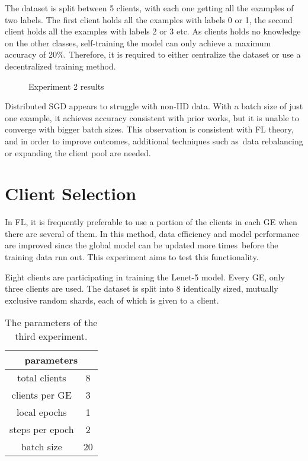The dataset is split between 5 clients, with each one getting all the examples of two labels. The first client holds all the examples with labels 0 or 1, the second client holds all the examples with labels 2 or 3 etc. As clients holds no knowledge on the other classes, self-training the model can only achieve a maximum accuracy of 20\%. Therefore, it is required to either centralize the dataset or use a decentralized training method.

\begin{figure}[H]
    \center
    
    \caption[Experiment 2 results]{Experiment 2 results}
    \label{fig:Experiment 2 results}
\end{figure}

Distributed SGD appears to struggle with non-IID data. With a batch size of just one example, it achieves accuracy consistent with prior works\cite{FL-original-paper}, but it is unable to converge with bigger batch sizes. This observation is consistent with FL theory, and in order to improve outcomes, additional techniques such as data rebalancing or expanding the client pool are needed.

\section{Client Selection}
In FL, it is frequently preferable to use a portion of the clients in each GE when there are several of them. In this method, data efficiency and model performance are improved since the global model can be updated more times before the training data run out. This experiment aims to test this functionality.

Eight clients are participating in training the Lenet-5 model. Every GE, only three clients are used. The dataset is split into 8 identically sized, mutually exclusive random shards, each of which is given to a client.

\begin{table}[H]
    \center
    \begin{tabular}{ | c | c | }
        \hline
        \multicolumn{2}{|c|}{ parameters } \\
        \hline\hline
         total clients & 8 \\
        \hline
        clients per GE & 3 \\
        \hline
        local epochs & 1 \\
        \hline
        steps per epoch & 2 \\
        \hline
        batch size & 20 \\
        \hline
    \end{tabular}
    \caption[Experiment 3 Parameters]{The parameters of the third experiment.}
    \label{table:Experiment 3 parameters}
\end{table}

